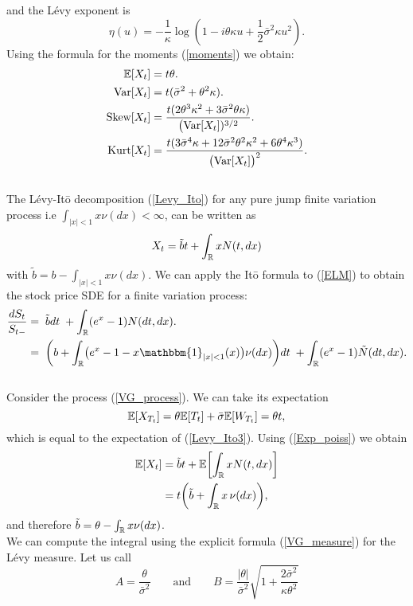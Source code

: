 and the Lévy exponent is 
\begin{equation}
 \eta(u) = -\frac{1}{\kappa} \log(1-i\theta \kappa u + \frac{1}{2} \bar\sigma^2 \kappa u^2).
\end{equation}
Using the formula for the moments (\ref{moments}) we obtain:
\begin{align}\label{VG_cumulants}
 \mathbb{E}[X_t] &= t\theta. \\ \nonumber
 \mbox{Var}[X_t] &= t(\bar\sigma^2 + \theta^2 \kappa). \\ \nonumber
 \mbox{Skew}[X_t] &= \frac{t (2\theta^3\kappa^2 + 3 \bar\sigma^2 \theta \kappa)}{\bigl(\mbox{Var}[X_t])^{3/2}}. \\ \nonumber
 \mbox{Kurt}[X_t] &= \frac{t (3\bar\sigma^4 \kappa + 12\bar\sigma^2 \theta^2 \kappa^2 +6\theta^4\kappa^3)}{\bigl(\mbox{Var}[X_t]\bigr)^2}.\nonumber 
\end{align}
\\
The Lévy-It\={o} decomposition (\ref{Levy_Ito}) for any pure jump finite variation process i.e $\int_{|x|<1} x \nu(dx) < \infty$, 
can be written as
\begin{equation}\label{Levy_Ito3}
X_t = \tilde b t + \int_{\mathbb{R}} x N(t,dx) 
\end{equation}
with $\tilde b = b - \int_{|x|<1} x \nu(dx)$. We can apply the It\={o} formula to (\ref{ELM}) to obtain the
stock price SDE for a finite variation process: 
\begin{align}
 \frac{d S_t}{S_{t-}}  &= \; \tilde b dt \; + \int_{\R} (e^{x} - 1) N(dt,dx).  \\ \nonumber
                       &= \; \biggl( b + \int_{\R} \bigl( e^{x} -1 -x \mathbbm{1}_{|x|<1}(x) \bigr) \nu(dx) \biggr) dt \; + \int_{\R} (e^{x} - 1) \tilde N(dt,dx).  
\end{align}
\\
Consider the process (\ref{VG_process}). We can take its expectation 
$$\mathbb{E}[X_{T_t}] = \theta \mathbb{E}[T_t] + \bar\sigma \mathbb{E}[W_{T_t}] = \theta t,$$ 
which is equal to the expectation of (\ref{Levy_Ito3}). Using (\ref{Exp_poiss}) we obtain
\begin{align}
 \mathbb{E}[X_t] &= \tilde b t + \mathbb{E} \biggl[ \int_{\mathbb{R}} x N(t,dx)\biggr] \\ \nonumber
	  &= t \biggl( \tilde b + \int_{\mathbb{R}} x \, \nu(dx) \biggr), \nonumber
\end{align}
and therefore $ \tilde b = \theta - \int_{\mathbb{R}} x \nu(dx) $.\\
We can compute the integral using the explicit formula (\ref{VG_measure}) for the Lévy measure.
Let us call $$A = \frac{\theta}{\bar\sigma^2} \hspace{2em} \mbox{and} \hspace{2em} 
B=\frac{|\theta|}{\bar\sigma^2}\sqrt{1+\frac{2\bar\sigma^2}{\kappa \theta^2}}$$
